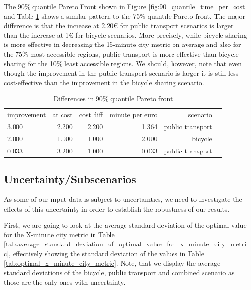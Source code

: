 The 90\% quantile Pareto Front shown in Figure \ref{fig:90_quantile_time_per_cost} and Table \ref{tab:differences_in_90_quantile_pareto_front} shows a similar pattern to the 75\% quantile Pareto front.
The major difference is that the increase at 2.20€ for public transport scenarios is larger than the increase at 1€ for bicycle scenarios.
More precisely, while bicycle sharing is more effective in decreasing the 15-minute city metric on average and also for the 75\% most accessible regions, public transport is more effective than bicycle sharing for the 10\% least accessible regions.
We should, however, note that even though the improvement in the public transport scenario is larger it is still less cost-effective than the improvement in the bicycle sharing scenario.


\begin{table}
  \caption{Differences in 90\% quantile Pareto front}
  \label{tab:differences_in_90_quantile_pareto_front}
  \begin{center}
    \begin{tabular}{lrrrrl}
     improvement & at cost & cost diff & minute per euro & scenario \\
     3.000 & 2.200 & 2.200 & 1.364 & public transport \\
     2.000 & 1.000 & 1.000 & 2.000 & bicycle \\
     0.033 & 3.200 & 1.000 & 0.033 & public transport \\
    \end{tabular}
  \end{center}
\end{table}


\subsection{Uncertainty/Subscenarios}
\label{subsec:uncertainty_subscenarios}

As some of our input data is subject to uncertainties, we need to investigate the effects of this uncertainty in order to establish the robustness of our results.

First, we are going to look at the average standard deviation of the optimal value for the X-minute city metric in Table \ref{tab:average_standard_deviation_of_optimal_value_for_x_minute_city_metric}, effectively showing the standard deviation of the values in Table \ref{tab:optimal_x_minute_city_metric}.
Note, that we display the average standard deviations of the bicycle, public transport and combined scenario as those are the only ones with uncertainty.

